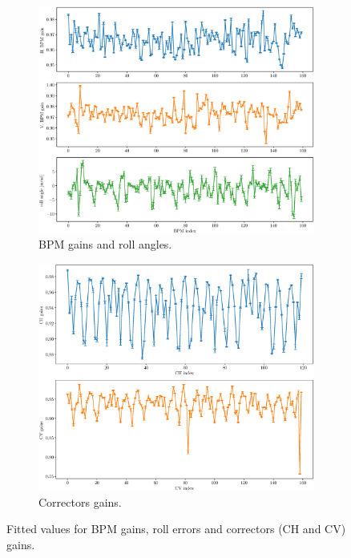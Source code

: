 \begin{figure}
\centering
\begin{subfigure}[t]{0.49\textwidth}
\includegraphics[width=1.0\textwidth]{figures/bpm_gains_iter0.eps}
    \caption{BPM gains and roll angles.}
    \label{subfig:bpm_fit}
\end{subfigure}
 \begin{subfigure}[t]{0.49\textwidth}
\includegraphics[width=1.0\textwidth]{figures/corr_gains_iter0.eps}
    \caption{Correctors gains.}
    \label{subfig:corr_fit}
\end{subfigure}
\caption{Fitted values for BPM gains, roll errors and correctors (CH and CV) gains.}
\label{fig:gain_fit}
\end{figure}

